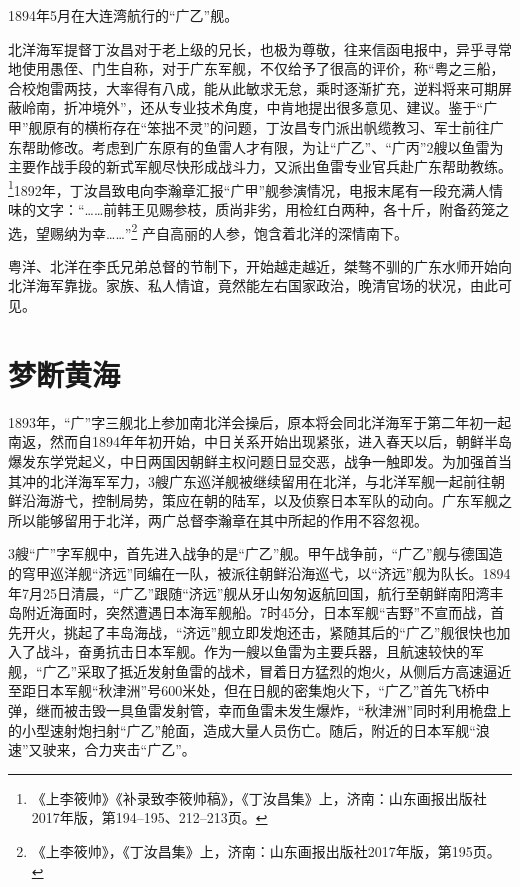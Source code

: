 \documentclass[12pt,UTF8]{ctexbook}
\begin{document}
1894年5月在大连湾航行的“广乙”舰。

北洋海军提督丁汝昌对于老上级的兄长，也极为尊敬，往来信函电报中，异乎寻常地使用愚侄、门生自称，对于广东军舰，不仅给予了很高的评价，称“粤之三船，合校炮雷两技，大率得有八成，能从此敏求无怠，乘时逐渐扩充，逆料将来可期屏蔽岭南，折冲境外”，还从专业技术角度，中肯地提出很多意见、建议。鉴于“广甲”舰原有的横桁存在“笨拙不灵”的问题，丁汝昌专门派出帆缆教习、军士前往广东帮助修改。考虑到广东原有的鱼雷人才有限，为让“广乙”、“广丙”2艘以鱼雷为主要作战手段的新式军舰尽快形成战斗力，又派出鱼雷专业官兵赴广东帮助教练。\footnote{《上李筱帅》《补录致李筱帅稿》，《丁汝昌集》上，济南：山东画报出版社2017年版，第194--195、212--213页。}1892年，丁汝昌致电向李瀚章汇报“广甲”舰参演情况，电报末尾有一段充满人情味的文字：“……前韩王见赐参枝，质尚非劣，用检红白两种，各十斤，附备药笼之选，望赐纳为幸……”\footnote{《上李筱帅》，《丁汝昌集》上，济南：山东画报出版社2017年版，第195页。} 产自高丽的人参，饱含着北洋的深情南下。

粤洋、北洋在李氏兄弟总督的节制下，开始越走越近，桀骜不驯的广东水师开始向北洋海军靠拢。家族、私人情谊，竟然能左右国家政治，晚清官场的状况，由此可见。

\section{梦断黄海}

1893年，“广”字三舰北上参加南北洋会操后，原本将会同北洋海军于第二年初一起南返，然而自1894年年初开始，中日关系开始出现紧张，进入春天以后，朝鲜半岛爆发东学党起义，中日两国因朝鲜主权问题日显交恶，战争一触即发。为加强首当其冲的北洋海军军力，3艘广东巡洋舰被继续留用在北洋，与北洋军舰一起前往朝鲜沿海游弋，控制局势，策应在朝的陆军，以及侦察日本军队的动向。广东军舰之所以能够留用于北洋，两广总督李瀚章在其中所起的作用不容忽视。

3艘“广”字军舰中，首先进入战争的是“广乙”舰。甲午战争前，“广乙”舰与德国造的穹甲巡洋舰“济远”同编在一队，被派往朝鲜沿海巡弋，以“济远”舰为队长。1894年7月25日清晨，“广乙”跟随“济远”舰从牙山匆匆返航回国，航行至朝鲜南阳湾丰岛附近海面时，突然遭遇日本海军舰船。7时45分，日本军舰“吉野”不宣而战，首先开火，挑起了丰岛海战，“济远”舰立即发炮还击，紧随其后的“广乙”舰很快也加入了战斗，奋勇抗击日本军舰。作为一艘以鱼雷为主要兵器，且航速较快的军舰，“广乙”采取了抵近发射鱼雷的战术，冒着日方猛烈的炮火，从侧后方高速逼近至距日本军舰“秋津洲”号600米处，但在日舰的密集炮火下，“广乙”首先飞桥中弹，继而被击毁一具鱼雷发射管，幸而鱼雷未发生爆炸，“秋津洲”同时利用桅盘上的小型速射炮扫射“广乙”舱面，造成大量人员伤亡。随后，附近的日本军舰“浪速”又驶来，合力夹击“广乙”。
\end{document}
